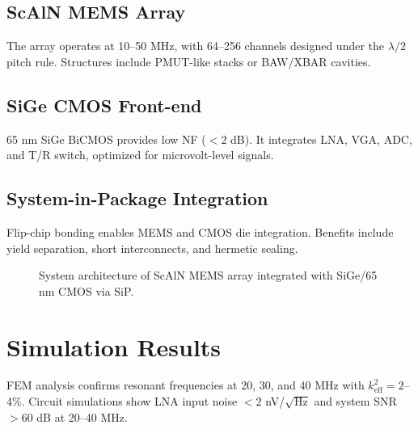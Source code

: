 \documentclass[conference]{IEEEtran}
\begin{document}
\subsection{ScAlN MEMS Array}
The array operates at 10--50 MHz, with 64--256 channels designed under the $\lambda/2$ pitch rule. 
Structures include PMUT-like stacks or BAW/XBAR cavities.

\subsection{SiGe CMOS Front-end}
65 nm SiGe BiCMOS provides low NF ($< 2$ dB). 
It integrates LNA, VGA, ADC, and T/R switch, optimized for microvolt-level signals.

\subsection{System-in-Package Integration}
Flip-chip bonding enables MEMS and CMOS die integration. 
Benefits include yield separation, short interconnects, and hermetic sealing.

\begin{figure}[htbp]
\centering
{}
\caption{System architecture of ScAlN MEMS array integrated with SiGe/65 nm CMOS via SiP.}
\label{fig:architecture}
\end{figure}

\section{Simulation Results}
FEM analysis confirms resonant frequencies at 20, 30, and 40 MHz with $k^2_{\mathrm{eff}} = 2$--4\%. 
Circuit simulations show LNA input noise $< 2$ nV/$\sqrt{\mathrm{Hz}}$ and system SNR $> 60$ dB at 20--40 MHz.
\end{document}
